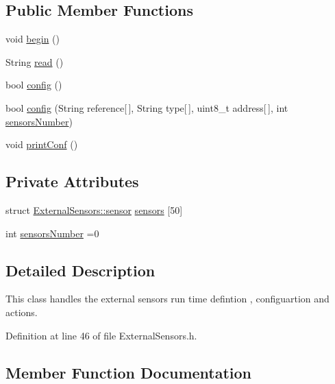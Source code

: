 \subsection*{Public Member Functions}
\begin{DoxyCompactItemize}
\item 
void \hyperlink{class_external_sensors_a58ede0d786a86417254708870f04a21e}{begin} ()
\item 
String \hyperlink{class_external_sensors_a53177b81eca3be89508b5511ddcd00fc}{read} ()
\item 
bool \hyperlink{class_external_sensors_a862a4bd11346b37270d0244c2adabe5a}{config} ()
\item 
bool \hyperlink{class_external_sensors_ac829858f587e15a3fcb00567248f0edd}{config} (String reference\mbox{[}$\,$\mbox{]}, String type\mbox{[}$\,$\mbox{]}, uint8\+\_\+t address\mbox{[}$\,$\mbox{]}, int \hyperlink{class_external_sensors_a58e4fbf9adeae787d92be5fa33043b5d}{sensors\+Number})
\item 
void \hyperlink{class_external_sensors_a78c2bf55084435dd51d3c559b2d3c6f3}{print\+Conf} ()
\end{DoxyCompactItemize}
\subsection*{Private Attributes}
\begin{DoxyCompactItemize}
\item 
struct \hyperlink{struct_external_sensors_1_1sensor}{External\+Sensors\+::sensor} \hyperlink{class_external_sensors_a284233f884fcf00154a44740cf1d9e1e}{sensors} \mbox{[}50\mbox{]}
\item 
int \hyperlink{class_external_sensors_a58e4fbf9adeae787d92be5fa33043b5d}{sensors\+Number} =0
\end{DoxyCompactItemize}


\subsection{Detailed Description}
This class handles the external sensors run time defintion , configuartion and actions. 

Definition at line 46 of file External\+Sensors.\+h.



\subsection{Member Function Documentation}
\mbox{\label{class_external_sensors_a58ede0d786a86417254708870f04a21e}} 
